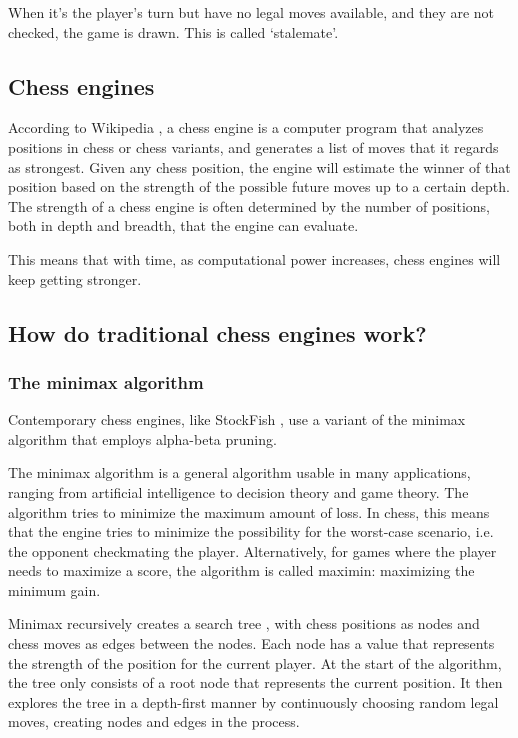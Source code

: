 \documentclass{article}
\begin{document}
When it's the player's turn but have no legal moves available, and they are not checked, the game is drawn.
This is called `stalemate'.

\subsection{Chess engines}

According to Wikipedia \cite{ChessEngine2022}, a chess engine is a computer program that analyzes 
positions in chess or chess variants, and generates a list of moves that it regards as strongest.
Given any chess position, the engine will estimate the winner of that position based on the strength 
of the possible future moves up to a certain depth. The strength of a chess engine is often determined by
the number of positions, both in depth and breadth, that the engine can evaluate. 

This means that with time, as computational power increases, chess engines will keep getting stronger.


\subsection{How do traditional chess engines work?}

\subsubsection{The minimax algorithm}

Contemporary chess engines, like StockFish \cite{StockfishChess2022}, use a variant of the minimax algorithm that employs alpha-beta pruning.

The minimax algorithm \cite{Minimax2022} is a general algorithm usable in many applications, ranging from artificial intelligence to 
decision theory and game theory. The algorithm tries to minimize the maximum amount of loss. In chess, this means 
that the engine tries to minimize the possibility for the worst-case scenario, i.e. the opponent checkmating the player. 
Alternatively, for games where the player needs to maximize a score, the algorithm is called maximin: maximizing the minimum gain. 

Minimax recursively creates a search tree \cite{eppesHowComputerizedChess2019}, with chess positions as nodes and chess moves as edges between the nodes. 
Each node has a value that represents the strength of the position for the current player. 
At the start of the algorithm, the tree only consists of a root node that represents the current position. 
It then explores the tree in a depth-first manner by continuously choosing random legal moves, creating nodes and edges in the process.
\end{document}
